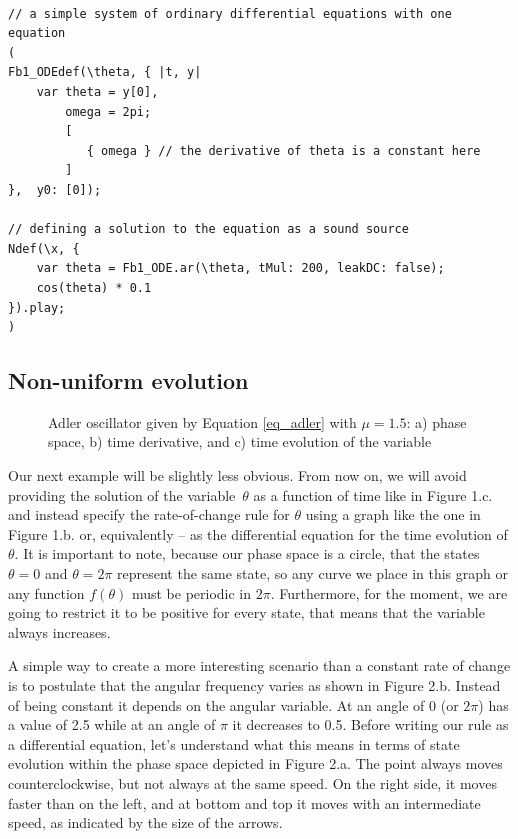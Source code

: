 \documentclass{article}
\begin{document}
\begin{lstlisting}[frame=single,caption= Defining equation 1 as a sound source]

// a simple system of ordinary differential equations with one equation
(
Fb1_ODEdef(\theta, { |t, y| 
    var theta = y[0], 
        omega = 2pi; 
        [
           { omega } // the derivative of theta is a constant here
        ] 
},  y0: [0]);

// defining a solution to the equation as a sound source
Ndef(\x, { 
    var theta = Fb1_ODE.ar(\theta, tMul: 200, leakDC: false);
    cos(theta) * 0.1 
}).play;
)
\end{lstlisting}

\subsection{Non-uniform evolution}

\begin{figure}[h]
    \centering
    \caption{Adler oscillator given by Equation \ref{eq_adler} with $\mu=1.5$: a) phase space, b) time derivative, and c) time evolution of the variable} 
    \label{fig_adler1}
\end{figure}

Our next example will be slightly less obvious. 
From now on, we will avoid providing the solution of the variable~$\theta$ as a function of time like in Figure 1.c. and instead specify the rate-of-change rule for $\theta$ using a graph like the one in Figure 1.b. or, equivalently -- as the differential equation for the time evolution of $\theta$.
It is important to note, because our phase space is a circle, that the states $\theta=0$ and $\theta=2\pi$ represent the same state, so any curve we place in this graph or any function $f(\theta)$ must be periodic in $2\pi$. 
Furthermore, for the moment, we are going to restrict it to be positive for every state, that means that the variable always increases. 

A simple way to create a more interesting scenario than a constant rate of change is to postulate that the angular frequency varies as shown in Figure 2.b. 
Instead of being constant it depends on the angular variable. 
At an angle of 0 (or $2\pi$) has a value of 2.5 while at an angle of $\pi$ it decreases to 0.5.
Before writing our rule as a differential equation, let’s understand what this means in terms of state evolution within the phase space depicted in Figure 2.a. 
The point always moves counterclockwise, but not always at the same speed. On the right side, it moves faster than on the left, and at bottom and top it moves with an intermediate speed, as indicated by the size of the arrows.
\end{document}
